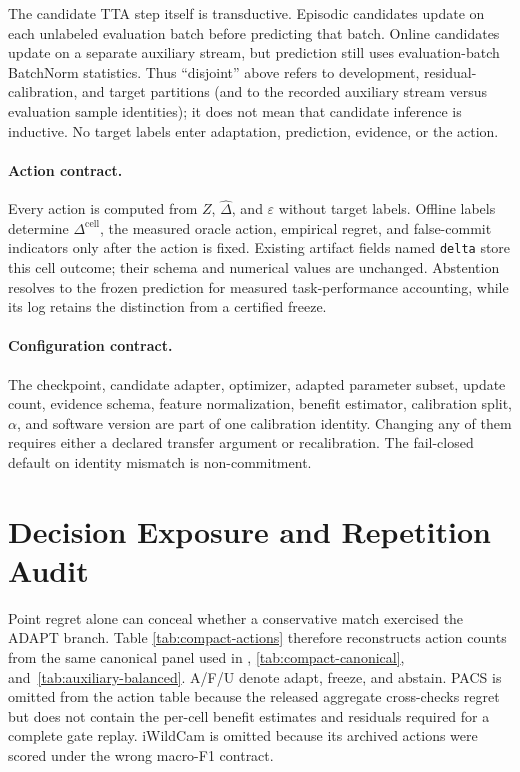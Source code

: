 The candidate TTA step itself is transductive. Episodic candidates update on each unlabeled
evaluation batch before predicting that batch. Online candidates update on a separate auxiliary
stream, but prediction still uses evaluation-batch BatchNorm statistics. Thus ``disjoint'' above
refers to development, residual-calibration, and target partitions (and to the recorded auxiliary
stream versus evaluation sample identities); it does not mean that candidate inference is
inductive. No target labels enter adaptation, prediction, evidence, or the action.

\paragraph{Action contract.}
Every action is computed from $Z$, $\widehat\Delta$, and $\varepsilon$ without target labels.
Offline labels determine $\Delta^{\mathrm{cell}}$, the measured oracle action, empirical regret,
and false-commit indicators only after the action is fixed. Existing artifact fields named
\texttt{delta} store this cell outcome; their schema and numerical values are unchanged.
Abstention resolves to the frozen prediction for measured task-performance accounting, while its log
retains the distinction from a certified freeze.

\paragraph{Configuration contract.}
The checkpoint, candidate adapter, optimizer, adapted parameter subset, update count, evidence
schema, feature normalization, benefit estimator, calibration split, $\alpha$, and software version
are part of one calibration identity. Changing any of them requires either a declared transfer
argument or recalibration. The fail-closed default on identity mismatch is non-commitment.

\section{Decision Exposure and Repetition Audit}
\label{app:compact-actions}

Point regret alone can conceal whether a conservative match exercised the ADAPT branch. Table
\ref{tab:compact-actions} therefore reconstructs action counts from the same canonical panel used
in , \ref{tab:compact-canonical}, and~\ref{tab:auxiliary-balanced}.
A/F/U denote adapt, freeze, and abstain. PACS is omitted from
the action table because the released aggregate cross-checks regret but does not contain the
per-cell benefit estimates and residuals required for a complete gate replay. iWildCam is omitted
because its archived actions were scored under the wrong macro-F1 contract.

